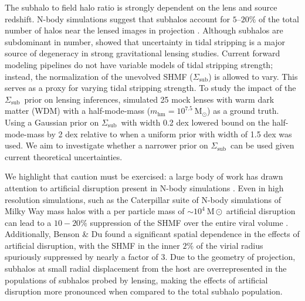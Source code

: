 \documentclass[%
 reprint,
 amsmath,
 amssymb,
 aps,
prd,
twocolumn,
superscriptaddress,
preprintnumbers,
floatfix,
nofootinbib
]{revtex4-2}
\def\cat{Caterpillar }
\def\sigsub{{$\Sigma_{\mathrm{sub}}$}}
\begin{document}
The subhalo to field halo ratio is strongly dependent on the lens and source redshift. 
N-body simulations suggest that subhalos account for $5$--$20\%$ of the total number of halos near the lensed images in projection \citep{10.1093/mnras/stu2673, 10.1093/mnras/sty159}. 
Although subhalos are subdominant in number, \citet{gilman2024turbocharging} showed that uncertainty in tidal stripping is a major source of degeneracy in strong gravitational lensing studies.  
Current forward modeling pipelines do not have variable models of tidal stripping strength; instead, the normalization of the unevolved SHMF (\sigsub) is allowed to vary. 
This serves as a proxy for varying tidal stripping strength. 
To study the impact of the \sigsub~prior on lensing inferences, \citet{gilman2024turbocharging} simulated 25 mock lenses with warm dark matter (WDM) with a half-mode-mass ($m_{\mathrm{hm}} = 10^{7.5}~\mathrm{M}_\odot$) as a ground truth.
Using a Gaussian prior on \sigsub~with width 0.2 dex lowered bound on the half-mode-mass by 2 dex relative to when a uniform prior with width of 1.5 dex was used.
We aim to investigate whether a narrower prior on \sigsub~can be used given current theoretical uncertainties.



We highlight that caution must be exercised: a large body of work has drawn attention to artificial disruption present in N-body simulations \citep{10.1093/mnras/stx2956,10.1093/mnras/stz2767,10.1093/mnras/stz3349,2022MNRAS.517.1398B}.
Even in high resolution simulations, such as the \cat \citep{griffen2016caterpillar} suite of N-body simulations of Milky Way mass halos with a per particle mass of $\sim 10^{4} ~\mathrm{M}\odot$ artificial disruption can lead to a $10 - 20 \%$ suppression of the SHMF over the entire viral volume \citep{2022MNRAS.517.1398B}.
Additionally, Benson \& Du \citep{2022MNRAS.517.1398B} found a significant spatial dependence in the effects of artificial disruption, with the SHMF in the inner $2 \%$ of the virial radius spuriously suppressed by nearly a factor of $3$.
Due to the geometry of projection, subhalos at small radial displacement from the host are overrepresented in the populations of subhalos probed by lensing, making the effects of artificial disruption more pronounced when compared to the total subhalo population.
\end{document}
